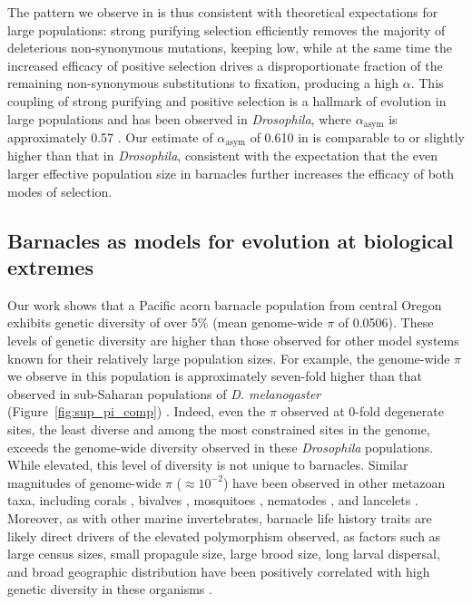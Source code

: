 The pattern we observe in \bgla{} is thus consistent with theoretical expectations
for large populations: strong purifying selection efficiently removes the majority
of deleterious non-synonymous mutations, keeping \dnds{} low, while at the same time
the increased efficacy of positive selection drives a disproportionate fraction of
the remaining non-synonymous substitutions to fixation, producing a high
$\alpha$. This coupling of strong purifying and positive selection is a hallmark
of evolution in large populations and has been observed in \textit{Drosophila}, where
$\alpha_\text{asym}$ is approximately 0.57 \citep{messer_frequent_2013}.
Our estimate of $\alpha_\text{asym}$ of 0.610 in \bgla{} is comparable to
or slightly higher than that in \textit{Drosophila}, consistent with the expectation
that the even larger effective population size in barnacles further increases the
efficacy of both modes of selection.
\vspace{0.1cm}

\subsection*{Barnacles as models for evolution at biological extremes}

Our work shows that a Pacific acorn barnacle population from central Oregon exhibits
genetic diversity of over 5\% (mean genome-wide $\pi$ of 0.0506).
These levels of genetic diversity are higher than those observed for other model
systems known for their relatively large population sizes.
For example, the genome-wide $\pi$ we observe in this population is approximately
seven-fold higher than that observed in sub-Saharan populations of
\textit{D. melanogaster} (Figure~\ref{fig:sup_pi_comp})
\citep{nunez_footprints_2025,li_comparative_2025,pool_population_2012,
langley_genomic_2012}.
Indeed, even the $\pi$ observed at 0-fold degenerate sites, the least diverse and
among the most constrained sites in the genome, exceeds the genome-wide diversity
observed in these \textit{Drosophila} populations.
While elevated, this level of diversity is not unique to barnacles.
Similar magnitudes of genome-wide $\pi$ ($\approx10^{-2}$) have been observed
in other metazoan taxa, including corals \citep{meziere_corals_2025}, bivalves
\citep{liu_bivalves_2025}, mosquitoes \citep{kent_aedes_2025,ag1000g}, nematodes
\citep{teterina_nematodes_2023}, and lancelets \citep{braso-vives_highly_2026}.
Moreover, as with other marine invertebrates, barnacle life history traits are likely
direct drivers of the elevated polymorphism observed, as factors such as large census
sizes, small propagule size, large brood size, long larval dispersal, and broad geographic
distribution have been positively correlated with high genetic diversity in these
organisms \citep{leffler_revisiting_2012,romiguier_comparative_2014}.
\vspace{0.1cm}

